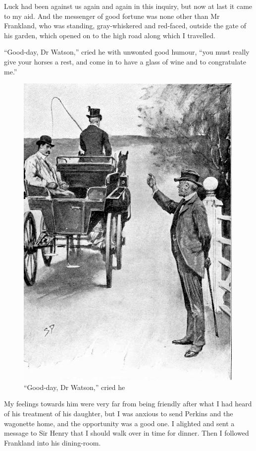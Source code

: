 \documentclass[paper=a5,BCOR=7mm,twoside,DIV=calc,12pt,usegeometry,openany,chapterprefix,endperiod,headings=big]{scrbook} %
\begin{document}
Luck had been against us again and again in this inquiry, but now at last it came to my aid. And the messenger of good fortune was none other than Mr Frankland, who was standing, gray-whiskered and red-faced, outside the gate of his garden, which opened on to the high road along which I travelled.

\enquote{Good-day, Dr Watson,} cried he with unwonted good hum\-our, \enquote{you must really give your horses a rest, and come in to have a glass of wine and to congratulate me.}


\begin{figure}[h!]
\centering
\includegraphics[width=.6\linewidth]{11_goodday}
\caption{\enquote{Good-day, Dr Watson,} cried he}
\end{figure}

My feelings towards him were very far from being friendly after what I had heard of his treatment of his daughter, but I was anxious to send Perkins and the wagonette home, and the opportunity was a good one. I alighted and sent a message to Sir Henry that I should walk over in time for dinner. Then I followed Frankland into his dining-room.
\end{document}
